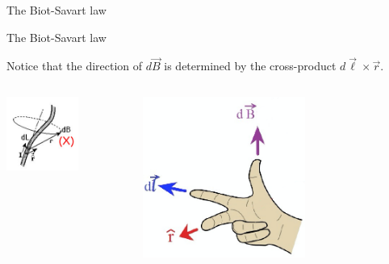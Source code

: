 \begin{frame}{The Biot-Savart law}
\end{frame}

%
%
%

\begin{frame}{The Biot-Savart law}

Notice that the direction of $d\vec{B}$ is determined by the cross-product $d\vec{\ell} \times \vec{r}$.

\begin{columns}
  \begin{column}{0.50\textwidth}
     \begin{center}
        \includegraphics[width=0.60\textwidth]{./images/schematics/biot_savart_with_dB_direction.jpg}\\
      \end{center}
  \end{column}
  \begin{column}{0.50\textwidth}
     \begin{center}
        \includegraphics[width=0.60\textwidth]{./images/schematics/biot_savart_right_hand_rule.png}\\
      \end{center}
  \end{column}
\end{columns}


\end{frame}
